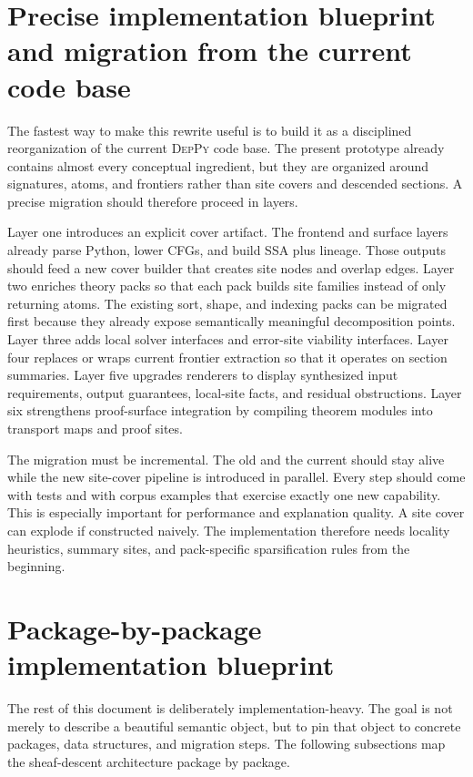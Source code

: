 \documentclass[11pt]{report}
\newcommand{\DepPy}{\textsc{DepPy}}
\DeclareRobustCommand{\py}[1]{\texttt{\detokenize{#1}}}
\theoremstyle{definition}
\theoremstyle{plain}
\begin{document}
\section{Precise implementation blueprint and migration from the current code base}

The fastest way to make this rewrite useful is to build it as a disciplined
reorganization of the current \DepPy{} code base. The present prototype already
contains almost every conceptual ingredient, but they are organized around
signatures, atoms, and frontiers rather than site covers and descended sections.
A precise migration should therefore proceed in layers.

Layer one introduces an explicit cover artifact. The frontend and surface layers
already parse Python, lower CFGs, and build SSA plus lineage. Those outputs
should feed a new cover builder that creates site nodes and overlap edges. Layer
two enriches theory packs so that each pack builds site families instead of only
returning atoms. The existing sort, shape, and indexing packs can be migrated
first because they already expose semantically meaningful decomposition points.
Layer three adds local solver interfaces and error-site viability interfaces.
Layer four replaces or wraps current frontier extraction so that it operates on
section summaries. Layer five upgrades renderers to display synthesized input
requirements, output guarantees, local-site facts, and residual obstructions.
Layer six strengthens proof-surface integration by compiling theorem modules into
transport maps and proof sites.

The migration must be incremental. The old \py{DepPyPipeline} and the current
\py{MonographPipeline} should stay alive while the new site-cover pipeline is
introduced in parallel. Every step should come with tests and with corpus
examples that exercise exactly one new capability. This is especially important
for performance and explanation quality. A site cover can explode if constructed
naively. The implementation therefore needs locality heuristics, summary sites,
and pack-specific sparsification rules from the beginning.


\section{Package-by-package implementation blueprint}

The rest of this document is deliberately implementation-heavy. The goal is not merely to describe a beautiful semantic object, but to pin that object to concrete packages, data structures, and migration steps. The following subsections map the sheaf-descent architecture package by package.
\end{document}
